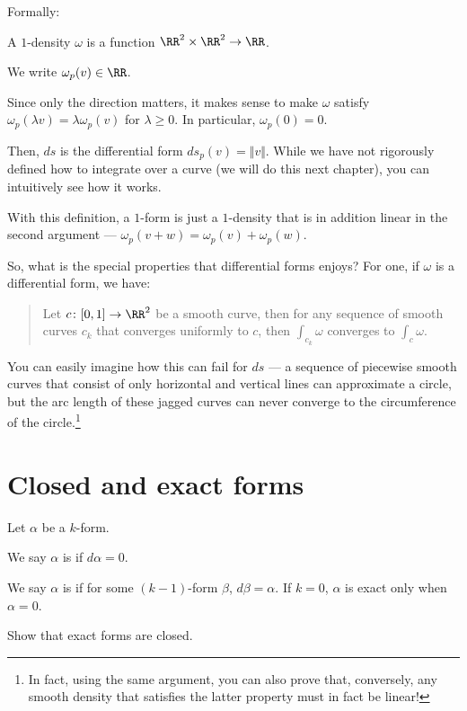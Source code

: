 Formally:
\begin{definition}[$1$-density]
	A $1$-density $\omega$ is a function $\RR^2 \times \RR^2 \to \RR$.
\end{definition}
We write $\omega_p(v) \in \RR$.

Since only the direction matters, it makes sense to make $\omega$ satisfy
$\omega_p(\lambda v) = \lambda \omega_p(v)$ for $\lambda \geq 0$.  In particular, $\omega_p(0) = 0$.

Then, $ds$ is the differential form $ds_p(v) = \Vert v \Vert$. While we have not rigorously defined
how to integrate over a curve (we will do this next chapter), you can intuitively see how it works.

With this definition, a $1$-form is just a $1$-density that is in addition linear in the second
argument --- $\omega_p(v + w) = \omega_p(v) + \omega_p(w)$.

So, what is the special properties that differential forms enjoys? For one, if $\omega$ is a
differential form, we have:
\begin{quote}
	Let $c \colon [0, 1] \to \RR^2$ be a smooth curve, then for any sequence of smooth curves $c_k$
	that converges uniformly to $c$, then $\int_{c_k} \omega$ converges to $\int_c \omega$.
\end{quote}

You can easily imagine how this can fail for $ds$ --- a sequence of piecewise smooth curves
that consist of only horizontal and vertical lines can approximate a circle, but the arc length of
these jagged curves can never converge to the circumference of the circle.\footnote{In fact, using
the same argument, you can also prove that, conversely, any smooth density that satisfies the latter
property must in fact be linear!}

\section{Closed and exact forms}
Let $\alpha$ be a $k$-form.
\begin{definition}
	We say $\alpha$ is  if $d\alpha = 0$.
\end{definition}
\begin{definition}
	We say $\alpha$ is  if for some $(k-1)$-form $\beta$,
	$d\beta = \alpha$.  If $k = 0$, $\alpha$ is exact only when $\alpha = 0$.
\end{definition}
\begin{ques}
	Show that exact forms are closed.
\end{ques}

